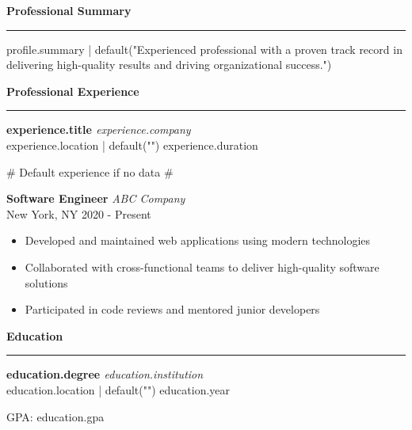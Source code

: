 \documentclass[letterpaper,11pt]{article}
\newcommand{\sectiontitle}[1]{
    \vspace{0.5em}
    \textcolor{primarycolor}{\Large\textbf{#1}}
    \vspace{0.2em}
    \hrule
    \vspace{0.5em}
}
\newcommand{\subsectiontitle}[4]{
    \textbf{#1} \hfill \textcolor{secondarycolor}{\textit{#2}} \\
    \textcolor{secondarycolor}{#3} \hfill \textcolor{secondarycolor}{#4}
}
\begin{document}
{%
\sectiontitle{Professional Summary}
{{ profile.summary | default("Experienced professional with a proven track record in delivering high-quality results and driving organizational success.") }}
{%

{%
\sectiontitle{Professional Experience}

{%
\subsectiontitle{ {{ experience.title }} }{ {{ experience.company }} }{ {{ experience.location | default("") }} }{ {{ experience.duration }} }


\vspace{0.3em}
{%

{# Default experience if no data #}
{%
\subsectiontitle{Software Engineer}{ABC Company}{New York, NY}{2020 - Present}

\begin{itemize}[leftmargin=1em, itemsep=0.2em]
    \item Developed and maintained web applications using modern technologies
    \item Collaborated with cross-functional teams to deliver high-quality software solutions
    \item Participated in code reviews and mentored junior developers
\end{itemize}

\vspace{0.3em}
{%

{%

{%
\sectiontitle{Education}

{%
\subsectiontitle{ {{ education.degree }} }{ {{ education.institution }} }{ {{ education.location | default("") }} }{ {{ education.year }} }

{%
\textcolor{secondarycolor}{GPA: {{ education.gpa }}}
{%

\vspace{0.3em}
{%

}}}}}}}}}}}}}
\end{document}
